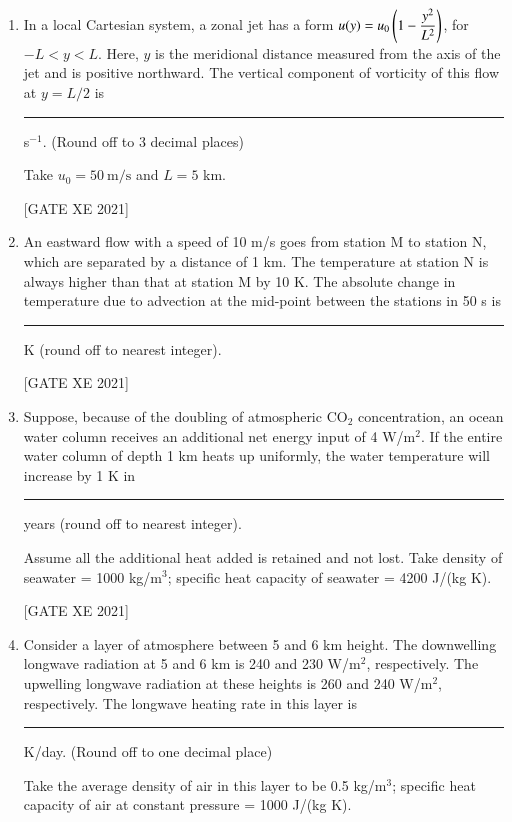 \documentclass[journal,12pt,onecolumn]{IEEEtran}
\theoremstyle{remark}
\begin{document}
\begin{enumerate}[resume]
Take acceleration due to gravity $g = 10\ \text{m/s}^2$, gas constant $R = 300\ \text{J/(kg K)}$, $T_0 = 300\ \text{K}$ and $\gamma = 1/30\ \text{K/m}$. Assume atmosphere behaves as an ideal gas.

\hfill[GATE XE 2021]


\item In a local Cartesian system, a zonal jet has a form $u(y) = u_0 \left(1 - \dfrac{y^2}{L^2}\right)$, for $-L<y<L$. Here, $y$ is the meridional distance measured from the axis of the jet and is positive northward. The vertical component of vorticity of this flow at $y=L/2$ is \rule{3cm}{0.15mm} s$^{-1}$. (Round off to 3 decimal places)  

Take $u_0 = 50\ \text{m/s}$ and $L = 5$ km.

\hfill[GATE XE 2021]


\item An eastward flow with a speed of 10 m/s goes from station M to station N, which are separated by a distance of 1 km. The temperature at station N is always higher than that at station M by 10 K. The absolute change in temperature due to advection at the mid-point between the stations in 50 s is \rule{3cm}{0.15mm} K (round off to nearest integer).

\hfill[GATE XE 2021]


\item Suppose, because of the doubling of atmospheric CO$_2$ concentration, an ocean water column receives an additional net energy input of 4 W/m$^2$. If the entire water column of depth 1 km heats up uniformly, the water temperature will increase by 1 K in \rule{3cm}{0.15mm} years (round off to nearest integer).  

Assume all the additional heat added is retained and not lost. Take density of seawater = 1000 kg/m$^3$; specific heat capacity of seawater = 4200 J/(kg K).

\hfill[GATE XE 2021]


\item Consider a layer of atmosphere between 5 and 6 km height. The downwelling longwave radiation at 5 and 6 km is 240 and 230 W/m$^2$, respectively. The upwelling longwave radiation at these heights is 260 and 240 W/m$^2$, respectively. The longwave heating rate in this layer is \rule{3cm}{0.15mm} K/day. (Round off to one decimal place)  

Take the average density of air in this layer to be 0.5 kg/m$^3$; specific heat capacity of air at constant pressure = 1000 J/(kg K).


\end{enumerate}
\end{document}
